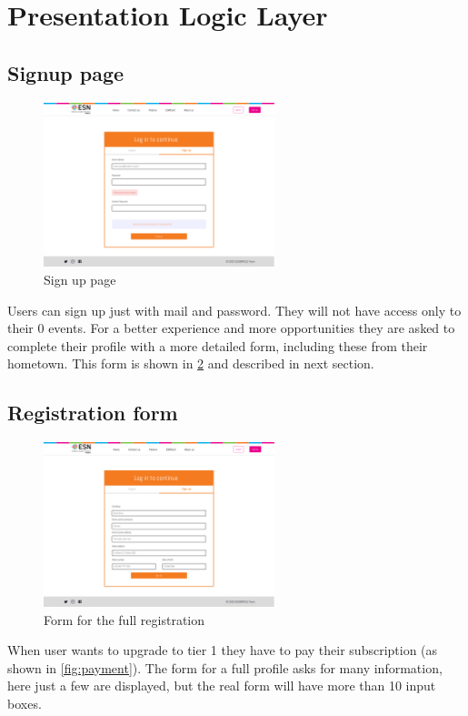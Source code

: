 \section{Presentation Logic Layer}


\lipsum[1]

\subsection{Signup page}
\begin{figure}[H]
    \centering
    \includegraphics[width=0.6\textwidth]{images/signup.png}
    \caption{Sign up page}
    \label{fig:signup page}
\end{figure}
Users can sign up just with mail and password. They will not have access only to their
0 events. For a better experience and more opportunities
they are asked to complete their profile with a more detailed form, including these from
their hometown. This form is shown in \ref{fig:form} and described in next section.
\subsection{Registration form}
\begin{figure}[H]
    \centering
    \includegraphics[width=0.6\textwidth]{images/form.png}
    \caption{Form for the full registration}
    \label{fig:form}
\end{figure}
When user wants to upgrade to tier 1 they have to pay their subscription (as shown in \ref{fig:payment}).
The form for a full profile asks for many information, here just a few are displayed, but the 
real form will have more than 10 input boxes. 
